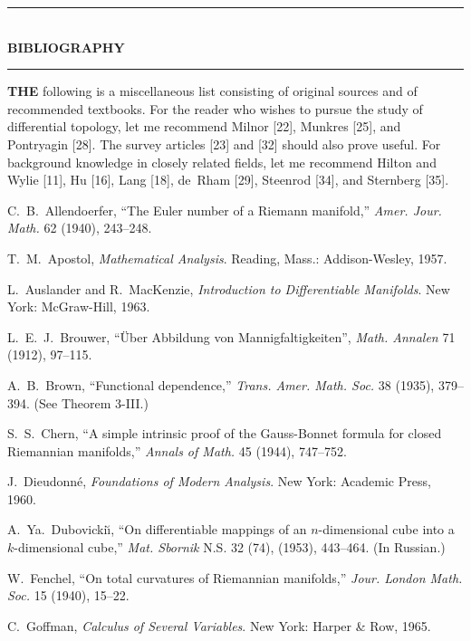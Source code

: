 
\thispagestyle{empty}
\mbox{}



\begin{center}
\rule{0.8\textwidth}{0.4pt}\\[0.6em]
{\large\bfseries BIBLIOGRAPHY}\\[0.6em]
\rule{0.8\textwidth}{0.4pt}
\end{center}

\noindent\textbf{THE} following is a miscellaneous list consisting of original sources and of recommended textbooks. For the reader who wishes to pursue the study of differential topology, let me recommend Milnor [22], Munkres [25], and Pontryagin [28]. The survey articles [23] and [32] should also prove useful. For background knowledge in closely related fields, let me recommend Hilton and Wylie [11], Hu [16], Lang [18], de~Rham [29], Steenrod [34], and Sternberg [35].

\medskip
\noindent [1] C.~B.~Allendoerfer, ``The Euler number of a Riemann manifold,'' \emph{Amer. Jour. Math.} 62 (1940), 243--248.

\noindent [2] T.~M.~Apostol, \emph{Mathematical Analysis}. Reading, Mass.: Addison-Wesley, 1957.

\noindent [3] L.~Auslander and R.~MacKenzie, \emph{Introduction to Differentiable Manifolds}. New York: McGraw-Hill, 1963.

\noindent [4] L.~E.~J.~Brouwer, ``\"Uber Abbildung von Mannigfaltigkeiten'', \emph{Math. Annalen} 71 (1912), 97--115.

\noindent [5] A.~B.~Brown, ``Functional dependence,'' \emph{Trans. Amer. Math. Soc.} 38 (1935), 379--394. (See Theorem 3-III.)

\noindent [6] S.~S.~Chern, ``A simple intrinsic proof of the Gauss-Bonnet formula for closed Riemannian manifolds,'' \emph{Annals of Math.} 45 (1944), 747--752.

\noindent [7] J.~Dieudonn\'e, \emph{Foundations of Modern Analysis}. New York: Academic Press, 1960.

\noindent [8] A.~Ya.~Dubovicki\u{\i}, ``On differentiable mappings of an $n$-dimensional cube into a $k$-dimensional cube,'' \emph{Mat. Sbornik} N.S. 32 (74), (1953), 443--464. (In Russian.)

\noindent [9] W.~Fenchel, ``On total curvatures of Riemannian manifolds,'' \emph{Jour. London Math. Soc.} 15 (1940), 15--22.

\noindent [10] C.~Goffman, \emph{Calculus of Several Variables}. New York: Harper \& Row, 1965.

